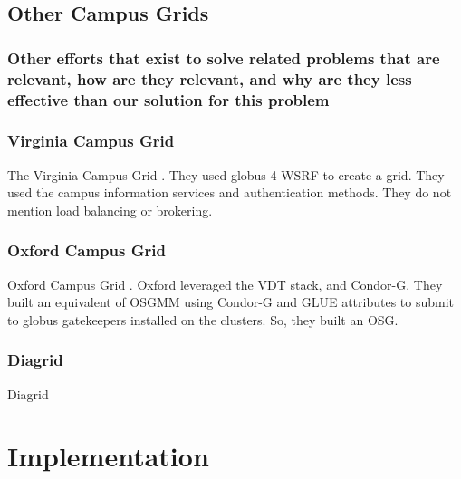 \documentclass[11pt]{article}
\begin{document}



\subsection{Other Campus Grids}
\subsubsection*{Other efforts that exist to solve related problems that are
relevant, how are they relevant, and why are they less effective than our
solution for this problem}

\subsubsection{Virginia Campus Grid}
The Virginia Campus Grid \cite{humphrey2005university}.  They used globus 4 WSRF to create a grid.  They used the campus information services and authentication methods.  They do not mention load balancing or brokering.

\subsubsection{Oxford Campus Grid}
Oxford Campus Grid \cite{wallom2006oxgrid}.  Oxford leveraged the VDT stack, and Condor-G.  They built an equivalent of OSGMM using Condor-G and GLUE attributes to submit to globus gatekeepers installed on the clusters.  So, they built an OSG.


\subsubsection{Diagrid}
Diagrid






\section{Implementation}
\label{sec:Implementation}
\end{document}
